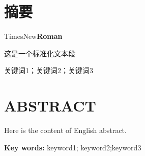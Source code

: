 %
%
%
%
%


\chapter*{\centering \heiti\sanhao 摘\quad 要}

\linespread{1.5}\selectfont
\fangsong\xiaosi

%

\vspace{1em}

\fangsong\xiaosi\linespread{1.5}{


这是一个摘要（摘要使用仿宋小四，正文用宋体小四）。

}


TimesNew{\bf{Roman}}


这是一个标准化文本段


 \fangsong 关键词1；关键词2；关键词3

\vspace{2em}

\setcounter{secnumdepth}{-1}
\chapter*{\centering \bfseries\xiaosan ABSTRACT}

\linespread{1.5}\selectfont
\rmfamily\xiaosi

Here is the content of English abstract.

\vspace{1em}

\textbf{Key words:} keyword1; \quad keyword2;\quad keyword3

\setcounter{secnumdepth}{2}


